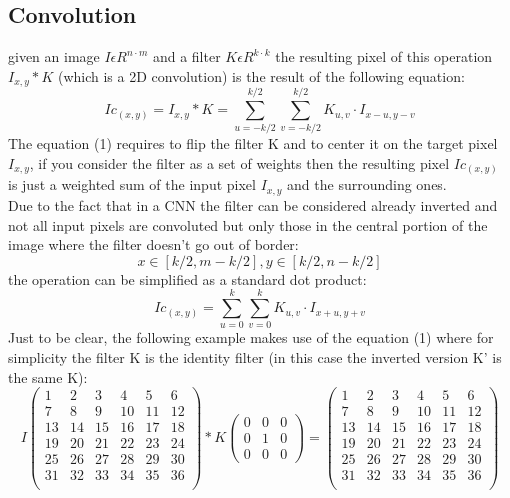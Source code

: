 \documentclass[a4paper]{report}
\begin{document}
\subsection{Convolution}
given an image \( I \epsilon R^{n \cdot m}  \) and a filter  \( K \epsilon R^{k \cdot k}  \) the resulting pixel of this operation \( I_{x,y} * K \) (which is a 2D convolution) is the result of the following equation:
\begin{equation} 
\label{conv1}
Ic_{(x,y)} = I_{x,y} * K = \sum_{u=-k/2}^{k/2}\sum_{v=-k/2}^{k/2}K_{u,v} \cdot I_{x-u,y-v}
 \end{equation}
The equation (1) requires to flip the filter K and to center it on the target pixel \( I_{x,y} \), if you consider the filter as a set of weights then the resulting pixel \( Ic_{(x,y)} \) is just a weighted sum of the input pixel \( I_{x,y} \) and the surrounding ones.\\
Due to the fact that in a CNN the filter can be considered already inverted and not all input pixels are convoluted but only those in the central portion of the image where the filter doesn't go out of border: \[x \in [k/2,m-k/2], y \in [k/2, n-k/2] \] the operation can be simplified as a standard dot product:
\begin{equation}
\label{conv2}
Ic_{(x,y)} = \sum_{u=0}^{k}\sum_{v=0}^{k}K_{u,v} \cdot I_{x+u,y+v}
 \end{equation}
Just to be clear, the following example makes use of the equation (1) where for simplicity the filter K is the identity filter (in this case the inverted version K' is the same K):
\[
I
\left(
\begin{array}{ccccccc}
  1&   2&  3&   4&   5&   6  \\
  7&   8&  9&  10&  11& 12         \\
  13&   14& 15& 16& 17& 18  \\
  19&   20& 21& 22& 23& 24 \\
  25&   26& 27& 28& 29& 30  \\
  31&   32& 33& 34& 35& 36 \\
\end{array}
\right)
*
K
\left(
\begin{array}{ccc}
  0&   0&  0 \\
  0&   1&  0 \\
  0&   0& 0 
\end{array}
\right)
=
\left(
\begin{array}{ccccccc}
  1&   2&  3&   4&   5&   6  \\
  7&   8&  9&  10&  11& 12         \\
  13&   14& 15& 16& 17& 18  \\
  19&   20& 21& 22& 23& 24 \\
  25&   26& 27& 28& 29& 30  \\
  31&   32& 33& 34& 35& 36 \\
\end{array}
\right)
\]
\end{document}
